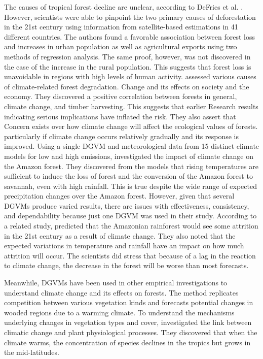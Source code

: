 The causes of tropical forest decline are unclear, according to DeFries et al. \parencite{defries2010}. However, scientists were able to pinpoint the two primary causes of deforestation in the 21st century using information from satellite-based estimations in 41 different countries. The authors found a favorable association between forest loss and increases in urban population as well as agricultural exports using two methods of regression analysis. The same proof, however, was not discovered in the case of the increase in the rural
population. This suggests that forest loss is unavoidable in regions with high levels of human activity.
\parencite{sohngen1998comparison} assessed various causes of climate-related forest degradation.  Change and its effects on society and the economy. They discovered a positive correlation between forests in general, climate change, and timber harvesting. This suggests that earlier  Research results indicating serious implications have inflated the risk. They also assert that  Concern exists over how climate change will affect the ecological values of forests.  particularly if climate change occurs relatively gradually and its response is improved.
Using a single DGVM and meteorological data from 15 distinct climate models for low and high emissions, \parencite{malhi2008climate} investigated the impact of climate change on the Amazon forest. They discovered from the models that rising temperatures are sufficient to induce the loss of forest and the conversion of the Amazon forest to savannah, even with high rainfall. This is true despite the wide range of expected precipitation changes over the Amazon forest. However, given that several DGVMs produce varied results, there are issues with effectiveness, consistency, and dependability because just one DGVM was used in their study. According to a related study, \parencite{sitch2008evaluation} predicted that the Amazonian rainforest would see some attrition in the 21st century as a result of climate change. They also noted that the expected variations in temperature and rainfall have an impact on how much attrition will occur. The scientists did stress that because of a lag in the reaction to climate change, the decrease in the forest will be worse than most forecasts.

Meanwhile, DGVMs have been used in other empirical investigations to understand climate change and its effects on forests. The method replicates competition between various vegetation kinds and forecasts potential changes in wooded regions due to a warming climate. To understand the mechanisms underlying changes in vegetation types and cover, \parencite{kattge2011try} investigated the link between climatic change and plant physiological processes. They discovered that when the climate warms, the concentration of species declines in the tropics but grows in the mid-latitudes.

